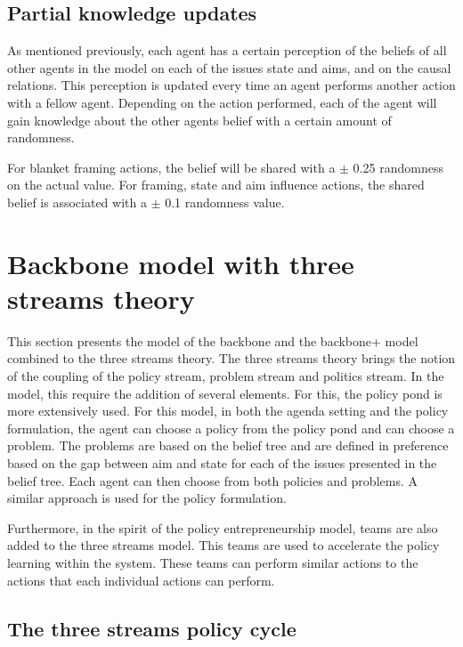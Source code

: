 \subsection{Partial knowledge updates}

As mentioned previously, each agent has a certain perception of the beliefs of all other agents in the model on each of the issues state and aims, and on the causal relations. This perception is updated every time an agent performs another action with a fellow agent. Depending on the action performed, each of the agent will gain knowledge about the other agents belief with a certain amount of randomness.

For blanket framing actions, the belief will be shared with a $\pm$ 0.25 randomness on the actual value. For framing, state and aim influence actions, the shared belief is associated with a $\pm$ 0.1 randomness value.

\section{Backbone model with three streams theory}

This section presents the model of the backbone and the backbone+ model combined to the three streams theory. The three streams theory brings the notion of the coupling of the policy stream, problem stream and politics stream. In the model, this require the addition of several elements. For this, the policy pond is more extensively used. For this model, in both the agenda setting and the policy formulation, the agent can choose a policy from the policy pond and can choose a problem. The problems are based on the belief tree and are defined in preference based on the gap between aim and state for each of the issues presented in the belief tree. Each agent can then choose from both policies and problems. A similar approach is used for the policy formulation.

Furthermore, in the spirit of the policy entrepreneurship model, teams are also added to the three streams model. This teams are used to accelerate the policy learning within the system. These teams can perform similar actions to the actions that each individual actions can perform.


\subsection{The three streams policy cycle}


